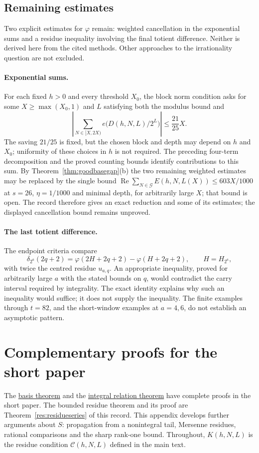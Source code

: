 \documentclass[11pt]{article}
\theoremstyle{plain}
\theoremstyle{definition}
\theoremstyle{remark}
\newcommand{\shortpaper}[2]{\href{erdos-249-binary-totient-series.pdf\##1}{#2}}
\begin{document}
\subsection{Remaining estimates}

Two explicit estimates for $\varphi$ remain: weighted cancellation
in the exponential sums and a residue inequality involving the final
totient difference. Neither is derived here from the cited methods.
Other approaches to the irrationality question are not excluded.



\paragraph{Exponential sums.} For each fixed $h>0$ and every
threshold $X_0$, the block norm condition asks for some $X\ge\max(X_0,1)$
and $L$ satisfying both the modulus bound and
\[
 \left|\sum_{N\in[X,2X)}e\bigl(D(h,N,L)/2^L\bigr)\right|
       \le\frac{21}{25}X.
\]
The saving $21/25$ is fixed, but the chosen block and depth may depend
on $h$ and $X_0$; uniformity of these choices in $h$ is not required.
The preceding four-term decomposition and the proved counting bounds
identify contributions to this sum. By
Theorem~\ref{thm:goodbasegap}(b) the two remaining weighted estimates may
be replaced by the single bound
$\operatorname{Re}\sum_{N\in\mathcal G}E(h,N,L(X))\le603X/1000$ at
$s=26$, $\eta=1/1000$ and minimal depth, for arbitrarily large $X$; that
bound is open. The record therefore gives an exact reduction and some of
its estimates; the displayed cancellation bound remains unproved.

\paragraph{The last totient difference.} The endpoint criteria compare
\[
 \delta_{2^a}(2q+2)
   =\varphi(2H+2q+2)-\varphi(H+2q+2),\qquad H=H_{2^a},
\]
with twice the centred residue $u_{a,q}$. An appropriate inequality,
proved for arbitrarily large $a$ with the stated bounds on $q$, would
contradict the carry interval required by integrality. The exact identity
explains why such an inequality would suffice; it does not supply the
inequality. The finite examples through $t=82$, and the short-window
examples at $a=4,6$, do not establish an asymptotic pattern.


\clearpage
\appendix
\section{Complementary proofs for the short paper}\label{app:r3-complements}
The \shortpaper{short249-proof}{basis theorem} and the
\shortpaper{short249-base-six}{integral relation theorem} have complete
proofs in the short paper. The bounded residue theorem and its proof are
Theorem~\ref{res:residueseries} of this record. This appendix develops
further arguments about $S$: propagation from a nonintegral tail,
Mersenne residues, rational comparisons and the sharp rank-one bound.
Throughout, $K(h,N,L)$ is the residue condition
$\mathcal C(h,N,L)$ defined in the main text.
\end{document}
